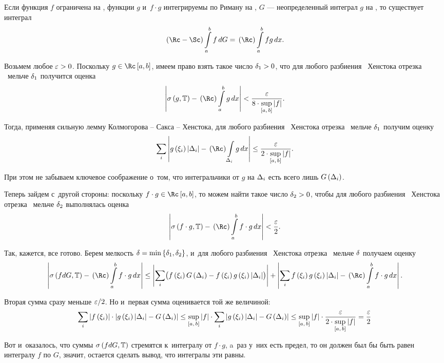 \documentclass[draft]{article}
\begin{document}

Если функция $f$ ограничена на \ab, функции $g$ и~$f\cdot g$
интегрируемы по Риману на \ab, $G$ --- неопределенный интеграл $g$
на \ab, то существует интеграл
$$\rimanst\intab f,G=\riman\intab fg,x.$$

\pr

Возьмем любое $\varepsilon > 0$. Поскольку $g\isriman[a,b]$, имеем право взять
такое число $\delta_1 > 0$, что для любого разбиения \Tdixif\
Хенстока отрезка \ab\ мельче $\delta_1$ получится оценка
$$\abs{\isgT-\riman\intab g,x}<{\ep\over8\cdot\sup\limits_{\seg[a,\,b]}\abs{f}}.$$

Тогда, применяя сильную лемму Колмогорова -- Сакса -- Хенстока, для
любого разбиения \Tdixif\ Хенстока отрезка \ab\ мельче $\delta_1$
получим оценку $$\sumi\abs{g\at(\xii)\ldei-\riman\intdei
g,x}\le{\ep\over2\cdot\sup\limits_{\seg[a,\,b]}\abs{f}}.$$

При этом не забываем ключевое соображение о~том, что интегральчики
от $g$ на $\Delta_i$ есть всего лишь $G\at(\dei)$.

\smallskip

Теперь зайдем с~другой стороны: поскольку $f\cdot g\isriman[a,b]$,
то можем найти такое число $\delta_2 > 0$, чтобы для любого разбиения
\Tdixif\ Хенстока отрезка \ab\ мельче $\delta_2$ выполнялась оценка
$$\abs{\isum(f\cdot g,\T)-\riman\intab f\cdot g,x}<{\ep\over2}.$$

Так, кажется, все готово. Берем мелкость
$\delta=\min\left\{\delta_1,\delta_2\right\}$, и~для любого разбиения \Tdixif\
Хенстока отрезка \ab\ мельче $\delta$ получаем оценку
$$\abs{\isum(fdG,\T)-\riman\intab f\cdot g,x}\le\abs{\sumi\bigl(
f\at(\xii)G\at(\dei)-f\at(\xii)g\at(\xii)\ldei\bigr)}+\abs{\sumi
f\at(\xii)g\at(\xii)\ldei-\riman\intab f\cdot g,x}.$$

Вторая сумма сразу меньше $\varepsilon/2$. Но и~первая сумма оценивается той
же величиной:
$$\sumi\abs{f\at(\xii)}\cdot\abs{g\at(\xii)\ldei-G\at(\dei)}\le
\sup\limits_{\seg[a,\,b]}\abs{f}\cdot\sumi\abs{g\at(\xii)\ldei-G\at(\dei)}\le
\sup\limits_{\seg[a,\,b]}\abs{f}\cdot{\ep\over2\cdot
\sup\limits_{\seg[a,\,b]}\abs{f}}={\ep\over2}$$

Вот и~оказалось, что суммы $\isum(fdG,\T)$ стремятся к~интегралу от
$f\cdot g$, a~раз у~них есть предел, то он должен был бы быть равен
интегралу $f$ по $G$, значит, остается сделать вывод, что интегралы
эти равны.

\prtm

\bigskip

\end{document}
